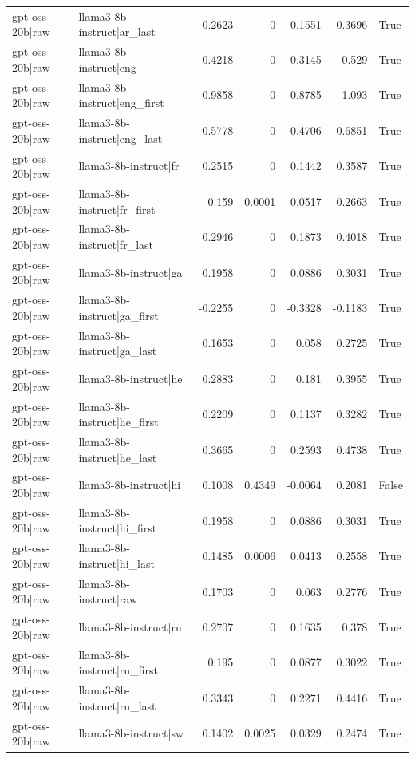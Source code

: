 \begin{table}
\begin{tabular}{l l r r r r l}
gpt-oss-20b|raw & llama3-8b-instruct|ar_last & 0.2623 & 0 & 0.1551 & 0.3696 & True \\
gpt-oss-20b|raw & llama3-8b-instruct|eng & 0.4218 & 0 & 0.3145 & 0.529 & True \\
gpt-oss-20b|raw & llama3-8b-instruct|eng_first & 0.9858 & 0 & 0.8785 & 1.093 & True \\
gpt-oss-20b|raw & llama3-8b-instruct|eng_last & 0.5778 & 0 & 0.4706 & 0.6851 & True \\
gpt-oss-20b|raw & llama3-8b-instruct|fr & 0.2515 & 0 & 0.1442 & 0.3587 & True \\
gpt-oss-20b|raw & llama3-8b-instruct|fr_first & 0.159 & 0.0001 & 0.0517 & 0.2663 & True \\
gpt-oss-20b|raw & llama3-8b-instruct|fr_last & 0.2946 & 0 & 0.1873 & 0.4018 & True \\
gpt-oss-20b|raw & llama3-8b-instruct|ga & 0.1958 & 0 & 0.0886 & 0.3031 & True \\
gpt-oss-20b|raw & llama3-8b-instruct|ga_first & -0.2255 & 0 & -0.3328 & -0.1183 & True \\
gpt-oss-20b|raw & llama3-8b-instruct|ga_last & 0.1653 & 0 & 0.058 & 0.2725 & True \\
gpt-oss-20b|raw & llama3-8b-instruct|he & 0.2883 & 0 & 0.181 & 0.3955 & True \\
gpt-oss-20b|raw & llama3-8b-instruct|he_first & 0.2209 & 0 & 0.1137 & 0.3282 & True \\
gpt-oss-20b|raw & llama3-8b-instruct|he_last & 0.3665 & 0 & 0.2593 & 0.4738 & True \\
gpt-oss-20b|raw & llama3-8b-instruct|hi & 0.1008 & 0.4349 & -0.0064 & 0.2081 & False \\
gpt-oss-20b|raw & llama3-8b-instruct|hi_first & 0.1958 & 0 & 0.0886 & 0.3031 & True \\
gpt-oss-20b|raw & llama3-8b-instruct|hi_last & 0.1485 & 0.0006 & 0.0413 & 0.2558 & True \\
gpt-oss-20b|raw & llama3-8b-instruct|raw & 0.1703 & 0 & 0.063 & 0.2776 & True \\
gpt-oss-20b|raw & llama3-8b-instruct|ru & 0.2707 & 0 & 0.1635 & 0.378 & True \\
gpt-oss-20b|raw & llama3-8b-instruct|ru_first & 0.195 & 0 & 0.0877 & 0.3022 & True \\
gpt-oss-20b|raw & llama3-8b-instruct|ru_last & 0.3343 & 0 & 0.2271 & 0.4416 & True \\
gpt-oss-20b|raw & llama3-8b-instruct|sw & 0.1402 & 0.0025 & 0.0329 & 0.2474 & True \\

\end{tabular}
\end{table}
